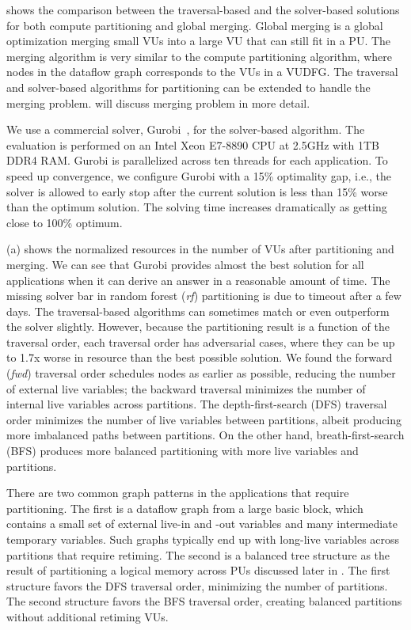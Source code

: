  shows the comparison between the traversal-based and the solver-based solutions for both
compute partitioning and global merging.
Global merging is a global optimization merging small VUs into a large VU that can still fit in
a PU. 
The merging algorithm is very similar to the compute partitioning algorithm, where nodes in the
dataflow graph corresponds to the VUs in a VUDFG. 
The traversal and solver-based algorithms for partitioning can be extended to handle the merging
problem.
 will discuss merging problem in more detail.

We use a commercial solver, Gurobi~\cite{gurobi}, for the solver-based algorithm. 
The evaluation is performed on an Intel Xeon E7-8890 CPU at 2.5GHz with 1TB DDR4 RAM. 
Gurobi is parallelized across ten threads for each application.
To speed up convergence, we configure Gurobi with a 15\% optimality gap, i.e., 
the solver is allowed to early stop after the current solution is less than 15\% worse than the optimum
solution. 
The solving time increases dramatically as getting close to 100\% optimum.

 (a) shows the normalized resources in the number of VUs after partitioning and merging.
We can see that Gurobi provides almost the best solution for all applications when it can derive
an answer in a reasonable amount of time. The missing solver bar in random forest (\emph{rf}) partitioning
is due to timeout after a few days.
The traversal-based algorithms can sometimes match or even outperform the solver slightly.
However, because the partitioning result is a function of the traversal order, 
each traversal order has adversarial cases, where they can be up to 1.7x worse in resource than the best possible solution.
We found the forward (\emph{fwd}) traversal order schedules nodes as earlier as possible, reducing the number of
external live variables; the backward traversal minimizes the number of internal live variables
across partitions.
The depth-first-search (DFS) traversal order minimizes the number of live variables between partitions, 
albeit producing more imbalanced paths between partitions. 
On the other hand, breath-first-search (BFS) produces more balanced partitioning with more live variables and partitions.

There are two common graph patterns in the applications that require partitioning. 
The first is a dataflow graph from a large basic block, which contains a small set of external
live-in and -out variables and many intermediate temporary variables.
Such graphs typically end up with long-live variables across partitions that require retiming.
The second is a balanced tree structure as the result of partitioning
a logical memory across PUs discussed later in .
The first structure favors the DFS traversal order, minimizing the number of partitions. The second
structure favors the BFS traversal order, creating balanced partitions without additional
retiming VUs.

